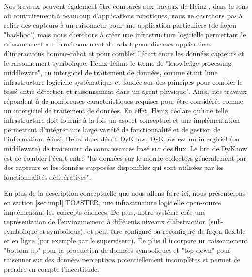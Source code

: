 \documentclass[a4paper,11pt,twoside]{StyleThese}
\begin{document}

Nos travaux peuvent également être comparés aux travaux de Heinz \cite{heintz2009dyknow}, dans le sens où contrairement à beaucoup d'applications robotiques, nous ne cherchons pas à relier des capteurs à un raisonneur pour une application particulière (de façon "had-hoc") mais nous cherchons à créer une infrastructure logicielle permettant le raisonnement sur l'environnement du robot pour diverses applications d'interactions homme-robot et pour combler l'écart entre les données capteurs et le raisonnement symbolique. Heinz définit le terme de "knowledge processing middleware"\cite{heintz2008knowledge}, ou intergiciel de traitement de données, comme étant "une infrastructure logicielle systématique et fondée sur des principes pour combler le fossé entre détection et raisonnement dans un agent physique". Ainsi, nos travaux répondent à de nombreuses caractéristiques requises pour être considérés comme un intergiciel de traitement de données. En effet, Heinz déclare qu'une telle infrastructure doit fournir à la fois un aspect conceptuel et une implémentation permettant d'intégrer une large variété de fonctionnalité et de gestion de l'information. Ainsi, Heinz dans \cite{heintz2010bridging} décrit DyKnow. DyKnow est un intergiciel (ou middleware) de traitement de connaissances basé sur des flux. Le but de DyKnow est de combler l'écart entre "les données sur le monde collectées généralement par des capteurs et les données supposées disponibles qui sont utilisées par les fonctionnalités délibératives".

En plus de la description conceptuelle que nous allons faire ici, nous présenterons en section \ref{sec:impl} TOASTER, une infrastructure logicielle open-source implémentant les concepts énoncés. De plus, notre système crée une représentation de l'environnement à différents niveaux d'abstraction (sub-symbolique et symbolique), et peut-être configuré ou reconfiguré de façon flexible et en ligne (par exemple par le superviseur). De plus il incorpore un raisonnement "bottom-up" pour la production de données symboliques et "top-down" pour raisonner sur des données perceptives potentiellement incomplètes et permet de prendre en compte l'incertitude.
\end{document}
